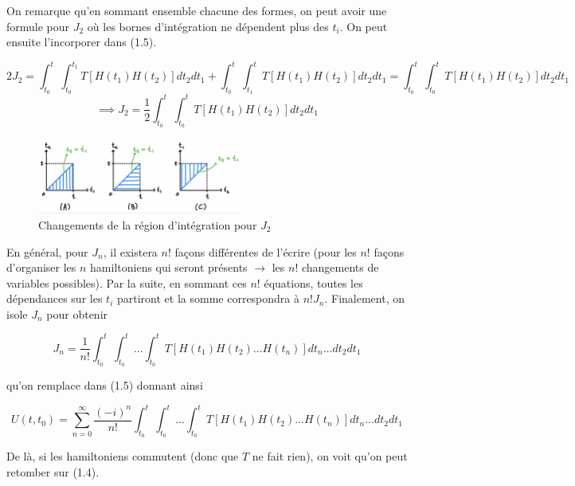 On remarque qu'en sommant ensemble chacune des formes, on peut avoir une formule pour $J_2$ où les bornes d'intégration ne dépendent plus des $t_i$. On peut ensuite l'incorporer dans (1.5).

\begin{equation*}
    2J_2 = \int_{t_0}^{t}\int_{t_0}^{t_1}T\left[H(t_1)H(t_2)\right]dt_2dt_1 + \int_{t_0}^{t}\int_{t_1}^{t}T\left[H(t_1)H(t_2)\right]dt_2dt_1 = \int_{t_0}^{t}\int_{t_0}^{t}T\left[H(t_1)H(t_2)\right]dt_2dt_1
\end{equation*}
\begin{equation}
    \implies J_2 = \frac{1}{2}\int_{t_0}^{t}\int_{t_0}^{t}T\left[H(t_1)H(t_2)\right]dt_2dt_1 
\end{equation}

\begin{figure}[H]
    \centering
     \includegraphics[width=0.6\textwidth]{images/ch1/region_integration.jpeg}
    \caption{Changements de la région d'intégration pour $J_2$}
\end{figure}


En général, pour $J_n$, il existera $n!$ façons différentes de l'écrire (pour les $n!$ façons d'organiser les $n$ hamiltoniens qui seront présents $\rightarrow$ les $n!$ changements de variables possibles). Par la suite, en sommant ces $n!$ équations, toutes les dépendances sur les $t_i$ partiront et la somme correspondra à $n!J_n$. Finalement, on isole $J_n$ pour obtenir 

\begin{equation}
    J_n = \frac{1}{n!}\int_{t_0}^{t}\int_{t_0}^{t}...\int_{t_0}^{t} T \left[H(t_1)H(t_2)...H(t_n)\right]dt_n ... dt_2 dt_1
\end{equation}

qu'on remplace dans (1.5) donnant ainsi

\begin{equation*}
    U(t,t_0) = \sum_{n=0}^{\infty}\frac{(-i)^n}{n!}\int_{t_0}^{t}\int_{t_0}^{t}...\int_{t_0}^{t} T \left[H(t_1)H(t_2)...H(t_n)\right]dt_n ... dt_2 dt_1
\end{equation*}

De là, si les hamiltoniens commutent (donc que $T$ ne fait rien), on voit qu'on peut retomber sur (1.4).

